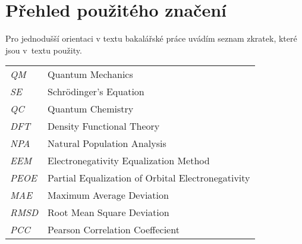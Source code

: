 \chapter*{Přehled použitého značení}

Pro jednodušší orientaci v textu bakalářské práce uvádím seznam zkratek, které jsou v~textu použity.
\begin{flushleft}
\begin{longtable}[l]{ll} %
  \textit{QM}                 & Quantum Mechanics
  \\[1mm]
  \textit{SE}                 & Schrödinger's Equation
  \\[1mm]
  \textit{QC }                & Quantum Chemistry
  \\[1mm]
  \textit{DFT}                & Density Functional Theory
  \\[1mm]
  \textit{NPA}                 & Natural Population Analysis
  \\[1mm]
  \textit{EEM}                 & Electronegativity Equalization Method
  \\[1mm]
  \textit{PEOE}                 & Partial Equalization of Orbital Electronegativity
  \\[1mm]
  \textit{MAE}                 & Maximum Average Deviation
  \\[1mm]
  \textit{RMSD}                 & Root Mean Square Deviation
  \\[1mm]
  \textit{PCC}                 & Pearson Correlation Coeffecient
  \\[1mm]

\end{longtable}
\end{flushleft}

